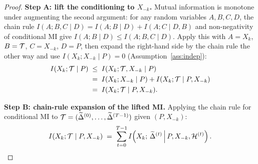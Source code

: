 \begin{proof}
\textbf{Step A: lift the conditioning to \(X_{-k}\).}
Mutual information is monotone under augmenting the second argument: for any random variables \(A,B,C,D\), the chain rule \(I(A;B,C\mid D) = I(A;B\mid D) + I(A;C\mid D,B)\) and non-negativity of conditional MI give \(I(A;B\mid D)\le I(A;B,C\mid D)\). Apply this with \(A=X_k\), \(B=\mathcal{T}\), \(C=X_{-k}\), \(D=P\), then expand the right-hand side by the chain rule the other way and use \(I(X_k;X_{-k}\mid P)=0\) (Assumption~\ref{ass:indep}):
\begin{align}
I(X_k;\mathcal{T}\mid P)
&\;\le\;I(X_k;\mathcal{T},X_{-k}\mid P)\notag\\
&\;=\;I(X_k;X_{-k}\mid P)+I(X_k;\mathcal{T}\mid P,X_{-k})\notag\\
&\;=\;I(X_k;\mathcal{T}\mid P,X_{-k}). \label{eq:lift}
\end{align}

\textbf{Step B: chain-rule expansion of the lifted MI.}
Applying the chain rule for conditional MI to \(\mathcal{T}=(\widetilde{\Delta}^{(0)},\dots,\widetilde{\Delta}^{(T-1)})\) given \((P,X_{-k})\):
\begin{equation}\label{eq:chain-T}
I(X_k;\mathcal{T}\mid P,X_{-k}) \;=\; \sum_{t=0}^{T-1} I\!\left(X_k;\,\widetilde{\Delta}^{(t)}\,\middle|\,P,X_{-k},\mathcal{H}^{(t)}\right).
\end{equation}


\end{proof}
